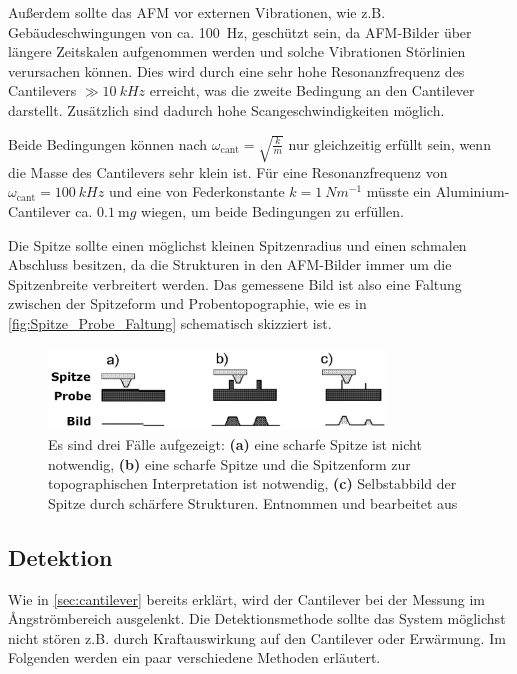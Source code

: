     Außerdem sollte das AFM vor externen Vibrationen, wie z.B. Gebäudeschwingungen von ca. \SI{100}{Hz}, geschützt sein, da AFM-Bilder über längere Zeitskalen aufgenommen werden und solche Vibrationen Störlinien verursachen können.
    Dies wird durch eine sehr hohe Resonanzfrequenz des Cantilevers $\gg \SI{10}{kHz}$ erreicht, was die zweite Bedingung an den Cantilever darstellt.
    Zusätzlich sind dadurch hohe Scangeschwindigkeiten möglich.
    
    Beide Bedingungen können nach $\omega_{\mathrm{cant}} = \sqrt{\frac{k}{m}}$ nur gleichzeitig erfüllt sein, wenn die Masse des Cantilevers sehr klein ist.
    Für eine Resonanzfrequenz von $\omega_{\mathrm{cant}} = \SI{100}{kHz}$ und eine von Federkonstante $k = \SI{1}{Nm^{-1}}$ müsste ein Aluminium-Cantilever ca. $\SI{0,1}{\milli g}$ wiegen, um beide Bedingungen zu erfüllen.

    Die Spitze sollte einen möglichst kleinen Spitzenradius und einen schmalen Abschluss besitzen, da die Strukturen in den AFM-Bilder immer um die Spitzenbreite verbreitert werden.
    Das gemessene Bild ist also eine Faltung zwischen der Spitzeform und Probentopographie, wie es in \autoref{fig:Spitze_Probe_Faltung} schematisch skizziert ist.
    \begin{figure}[ht]
        \centering\captionsetup{format=plain}
        \includegraphics[width=0.8\textwidth]{bilder/Spitze_Probe_Faltung.png}
        \caption{Es sind drei Fälle aufgezeigt: \textbf{(a)} eine scharfe Spitze ist nicht notwendig, \textbf{(b)} eine scharfe Spitze und die Spitzenform zur topographischen Interpretation ist notwendig, \textbf{(c)} Selbstabbild der Spitze durch schärfere Strukturen. Entnommen und bearbeitet aus \cite{AFM_image_artifacts}}
        \label{fig:Spitze_Probe_Faltung}
    \end{figure}

\subsection{Detektion}
\label{sec:detektion}
    Wie in \autoref{sec:cantilever} bereits erklärt, wird der Cantilever bei der Messung im \r{A}ngströmbereich ausgelenkt.
    Die Detektionsmethode sollte das System möglichst nicht stören z.B. durch Kraftauswirkung auf den Cantilever oder Erwärmung.
    Im Folgenden werden ein paar verschiedene Methoden erläutert.

